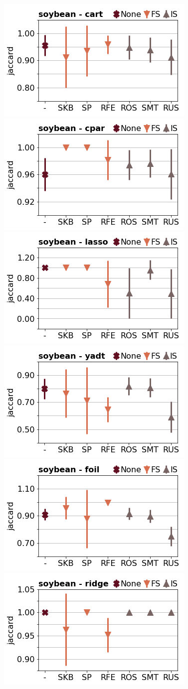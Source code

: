 \documentclass[runningheads,a4paper]{llncs}
\begin{document}
\begin{figure}[!h]
\includegraphics[width=0.32\linewidth]{fig/preps_soybean_DT_sklearn_jaccard.png}
\includegraphics[width=0.32\linewidth]{fig/preps_soybean_RB_cpar_jaccard.png}
\includegraphics[width=0.32\linewidth]{fig/preps_soybean_LM_lasso_jaccard.png}
\includegraphics[width=0.32\linewidth]{fig/preps_soybean_DT_yadt_jaccard.png}
\includegraphics[width=0.32\linewidth]{fig/preps_soybean_RB_foil_jaccard.png}
\includegraphics[width=0.32\linewidth]{fig/preps_soybean_LM_ridge_jaccard.png}
\end{figure}
\end{document}
